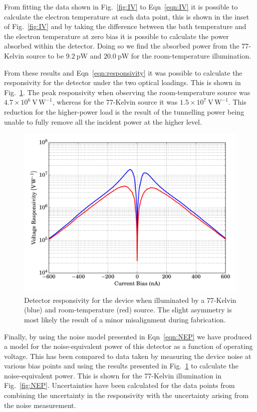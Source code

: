 \documentclass[journal, a4paper]{IEEEtran}
\begin{document}
\par 
From fitting the data shown in Fig.~\ref{fig:IV} to Eqn~\ref{eqn:IV} it is possible to calculate the electron temperature at each data point, this is shown in the inset of Fig.~\ref{fig:IV} and by taking the difference between the bath temperature and the electron temperature at zero bias it is possible to calculate the power absorbed within the detector. Doing so we find the absorbed power from the 77-Kelvin source to be $9.2~\mathrm{pW}$ and $20.0~\mathrm{pW}$ for the room-temperature illumination.
\par 
From these results and Eqn~\ref{eqn:responsivity} it was possible to calculate the responsivity for the detector under the two optical loadings. This is shown in Fig.~\ref{fig:responsivity}. The peak responsivity when observing the room-temperature source was $4.7 \times 10^{6}~\mathrm{V\,W^{-1}}$, whereas for the 77-Kelvin source it was $1.5 \times 10^{7}~\mathrm{V\,W^{-1}}$. This reduction for the higher-power load is the result of the tunnelling power being unable to fully remove all the incident power at the higher level.
\begin{figure}[tb]
\begin{center}
\includegraphics[width=0.9\columnwidth]{responsivity}
\caption{Detector responsivity for the device when illuminated by a 77-Kelvin (blue) and room-temperature (red) source. The slight asymmetry is most likely the result of a minor misalignment during fabrication.}
\label{fig:responsivity}
\end{center}
\end{figure}
\par 
Finally, by using the noise model presented in Eqn~\ref{eqn:NEP} we have produced a model for the noise-equivalent power of this detector as a function of operating voltage. This has been compared to data taken by measuring the device noise at various bias points and using the results presented in Fig.~\ref{fig:responsivity} to calculate the noise-equivalent power. This is shown for the 77-Kelvin illumination in Fig.~\ref{fig:NEP}. Uncertainties have been calculated for the data points from combining the uncertainty in the responsivity with the uncertainty arising from the noise measurement.
\end{document}
